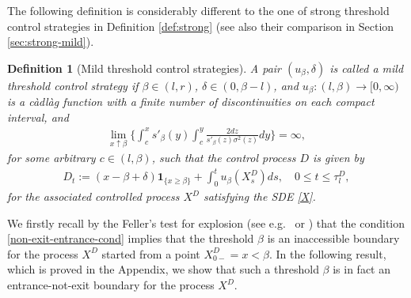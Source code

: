 \documentclass[11pt]{article} %
\newtheorem{definition}[theorem]{Definition}
\numberwithin{komcounter}{section}
\begin{document}
The following definition is considerably different to the one of strong threshold control strategies in Definition \ref{def:strong} (see also their comparison in Section \ref{sec:strong-mild}). 

\begin{definition} [Mild threshold control strategies] \label{def:mixed0}
A pair $(u_\beta,\delta)$ is called a mild threshold control strategy if 
$\beta\in(l,r)$, 
$\delta \in (0,\beta-l)$, 
and 
$u_\beta:(l,\beta)\rightarrow [0,\infty)$ is a c\`adl\`ag function with a finite number of discontinuities on each compact interval, and 
\begin{align}\label{non-exit-entrance-cond}
\lim_{x \uparrow \beta} \bigg\{ \int_c^x s'_\beta(y)\int_c^y \frac{2dz}{s'_\beta(z)\sigma^2(z)} dy \bigg\} = \infty,
\end{align}
for some arbitrary $c\in (l,\beta)$, such that the control process $D$ is given by 
\begin{align*}
D_t := (x-\beta+\delta) \mathbf{1}_{\{x \geq \beta \}} + \int_{0}^{t} u_\beta(X_s^D) ds , 
\quad 0 \leq t \leq \tau^D_l,
\end{align*}
for the associated controlled process $X^D$ satisfying the SDE \eqref{X}. 
\end{definition}

We firstly recall by the Feller’s test for explosion (see e.g.~\cite[Section 5.5]{Karatzas2} or \cite[Section II.1.6]{borodin2012handbook}) that the condition \eqref{non-exit-entrance-cond} implies that the threshold $\beta$ is an inaccessible boundary for the process $X^D$ started from a point $X^D_{0-}=x<\beta$. 
In the following result, which is proved in the Appendix, we show that such a threshold $\beta$ is in fact an entrance-not-exit boundary for the process $X^D$.
\end{document}
